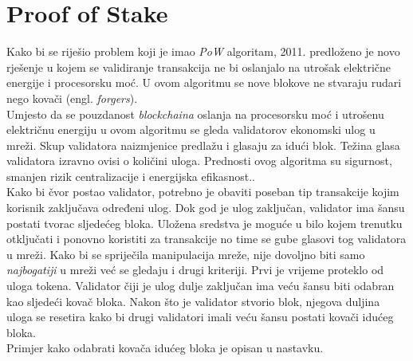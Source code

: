 \documentclass[times, utf8, zavrsni, numeric]{fer}
\begin{document}
\section{Proof of Stake}
Kako bi se riješio problem koji je imao \emph{PoW} algoritam, 2011. predloženo je novo rješenje u kojem se validiranje transakcija ne bi oslanjalo na utrošak električne energije
i procesorsku moć. U ovom algoritmu se nove blokove ne stvaraju rudari nego kovači (engl. \emph{forgers}). \\ Umjesto da se pouzdanost \emph{blockchaina} oslanja
na procesorsku moć i utrošenu električnu energiju u ovom algoritmu se gleda validatorov ekonomski ulog u mreži. Skup validatora naizmjenice predlažu
i glasaju za idući blok. Težina glasa validatora izravno ovisi o količini uloga. Prednosti ovog algoritma su sigurnost, smanjen rizik centralizacije i 
energijska efikasnost.\citep{PoSGithub}. \\
Kako bi čvor postao validator, potrebno je obaviti poseban tip transakcije kojim korisnik zaključava određeni ulog. Dok god je ulog zaključan, validator ima šansu
postati tvorac sljedećeg bloka. Uložena sredstva je moguće u bilo kojem trenutku otključati i ponovno koristiti za transakcije no time se gube glasovi tog validatora u mreži.
Kako bi se spriječila manipulacija mreže, nije dovoljno biti samo \emph{najbogatiji} u mreži već se gledaju i drugi kriteriji. Prvi je vrijeme proteklo od uloga tokena.
Validator čiji je ulog dulje zaključan ima veću šansu biti odabran kao sljedeći kovač bloka. Nakon što je validator stvorio blok, njegova duljina uloga se resetira kako
bi drugi validatori imali veću šansu postati kovači idućeg bloka.\citep{posMedium} \\
Primjer kako  odabrati kovača idućeg bloka je opisan u nastavku\citep{posGraphic}. 
\end{document}
